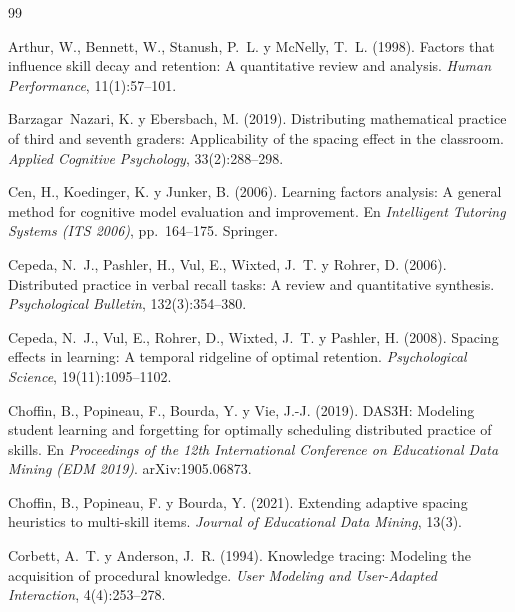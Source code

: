 \begin{thebibliography}{99}
\small

Arthur, W., Bennett, W., Stanush, P.~L. y McNelly, T.~L. (1998).
\newblock Factors that influence skill decay and retention: A quantitative review and analysis.
\newblock \emph{Human Performance}, 11(1):57--101.

Barzagar~Nazari, K. y Ebersbach, M. (2019).
\newblock Distributing mathematical practice of third and seventh graders: Applicability of the spacing effect in the classroom.
\newblock \emph{Applied Cognitive Psychology}, 33(2):288--298.

Cen, H., Koedinger, K. y Junker, B. (2006).
\newblock Learning factors analysis: A general method for cognitive model evaluation and improvement.
\newblock En \emph{Intelligent Tutoring Systems (ITS 2006)}, pp.~164--175. Springer.

Cepeda, N.~J., Pashler, H., Vul, E., Wixted, J.~T. y Rohrer, D. (2006).
\newblock Distributed practice in verbal recall tasks: A review and quantitative synthesis.
\newblock \emph{Psychological Bulletin}, 132(3):354--380.

Cepeda, N.~J., Vul, E., Rohrer, D., Wixted, J.~T. y Pashler, H. (2008).
\newblock Spacing effects in learning: A temporal ridgeline of optimal retention.
\newblock \emph{Psychological Science}, 19(11):1095--1102.

Choffin, B., Popineau, F., Bourda, Y. y Vie, J.-J. (2019).
\newblock DAS3H: Modeling student learning and forgetting for optimally scheduling distributed practice of skills.
\newblock En \emph{Proceedings of the 12th International Conference on Educational Data Mining (EDM 2019)}. arXiv:1905.06873.

Choffin, B., Popineau, F. y Bourda, Y. (2021).
\newblock Extending adaptive spacing heuristics to multi-skill items.
\newblock \emph{Journal of Educational Data Mining}, 13(3).

Corbett, A.~T. y Anderson, J.~R. (1994).
\newblock Knowledge tracing: Modeling the acquisition of procedural knowledge.
\newblock \emph{User Modeling and User-Adapted Interaction}, 4(4):253--278.


\end{thebibliography}
